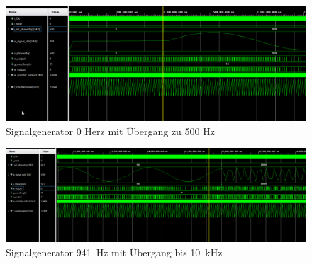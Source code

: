 \documentclass[a4paper,11pt,DIV=11,parskip=half]{scrartcl}
\begin{document}
\begin{figure}[H]
	\centering
	\includegraphics[width=\textwidth]{Bilder/Signalgenerator_0.png}
	\caption{Signalgenerator 0 Herz mit Übergang zu 500 Hz}
	\label{fig:tb_DDS_PWM3}
\end{figure}
\begin{figure}[H]
	\centering
	\includegraphics[width=\textwidth]{Bilder/Signalgenerator_941_10000.png}
	\caption{Signalgenerator \SI{941}{Hz} mit Übergang bis \SI{10}{kHz}}
	\label{fig:tb_DDS_PWM4}
\end{figure}





\end{document}
